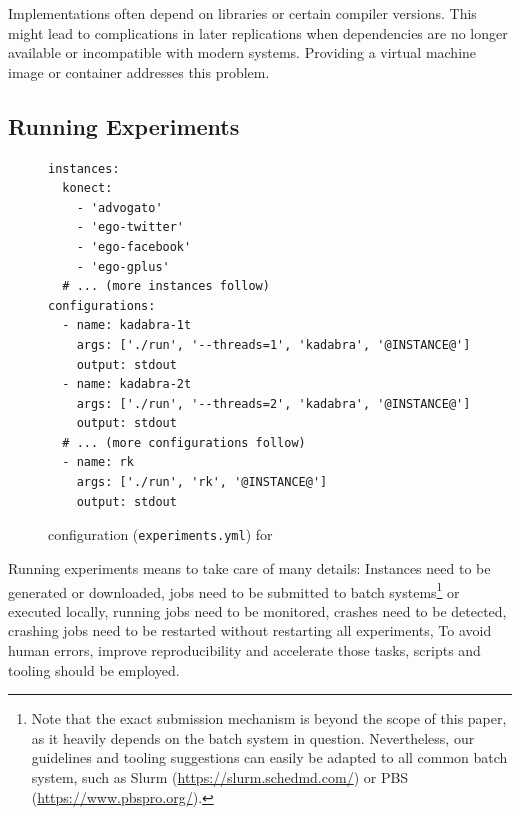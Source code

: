 \documentclass[algorithms,article,submit,moreauthors,pdftex]{Definitions/mdpi}
\newcounter{guideline}
\newcommand{\changed}[1]{#1}
\begin{document}
Implementations often depend on libraries or certain compiler versions.
This might lead to complications in later replications when dependencies are no longer available or incompatible with modern systems.
Providing a virtual machine image or container addresses this problem.

\subsection{Running Experiments}
\label{sub:submission-collection}
%
	\newcommand{\sourceline}[1]{\begin{center}#1\end{center}}

\begin{figure}[tb]
\scriptsize
\begin{verbatim}
instances:
  konect:
    - 'advogato'
    - 'ego-twitter'
    - 'ego-facebook'
    - 'ego-gplus'
  # ... (more instances follow)
configurations:
  - name: kadabra-1t
    args: ['./run', '--threads=1', 'kadabra', '@INSTANCE@']
    output: stdout
  - name: kadabra-2t
    args: ['./run', '--threads=2', 'kadabra', '@INSTANCE@']
    output: stdout
  # ... (more configurations follow)
  - name: rk
    args: ['./run', 'rk', '@INSTANCE@']
    output: stdout
\end{verbatim}
\caption{\exptool configuration (\texttt{experiments.yml}) for \kad}
\label{fig:kadabra_exptool}
\end{figure}

	Running experiments means to take care of many details: Instances need to be
	generated or downloaded, jobs need to be submitted to batch
	systems\footnote{Note that the exact submission mechanism is beyond the scope
		of this paper, as it heavily depends on the batch system in question.
		Nevertheless, our guidelines and tooling suggestions can easily be adapted
		to all common batch system, such as Slurm (\url{https://slurm.schedmd.com/}) or PBS (\url{https://www.pbspro.org/}).
        }
	or executed locally, running jobs need to be monitored,
	crashes need to be detected, crashing jobs need to be restarted without restarting
	all experiments, \etc
	To avoid human errors, improve \changed{reproducibility} and accelerate those tasks,
	scripts and tooling should be employed.
\end{document}
